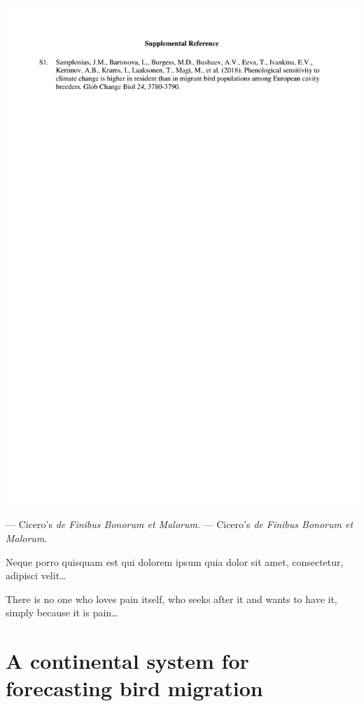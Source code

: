\documentclass[a4paper, twoside]{templates/ociamthesis}
\begin{document}
\includegraphics[width=1\linewidth]{pdf_chapters/pied/pied_supp_crop_Part7}

--- Cicero's \emph{de Finibus Bonorum et Malorum}. --- Cicero's \emph{de Finibus Bonorum et Malorum}.

\begin{savequote}
Neque porro quisquam est qui dolorem ipsum quia dolor sit amet,
consectetur, adipisci velit\ldots{}

There is no one who loves pain itself, who seeks after it and wants to
have it, simply because it is pain\ldots{}
\end{savequote}

\hypertarget{continental-system}{%
\chapter{A continental system for forecasting bird migration}\label{continental-system}}
\end{document}
